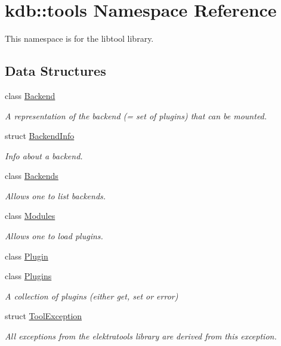 \hypertarget{namespacekdb_1_1tools}{\section{kdb\-:\-:tools Namespace Reference}
\label{namespacekdb_1_1tools}
}


This namespace is for the libtool library.  


\subsection*{Data Structures}
\begin{DoxyCompactItemize}
\item 
class \hyperlink{classkdb_1_1tools_1_1Backend}{Backend}
\begin{DoxyCompactList}\small\item\em A representation of the backend (= set of plugins) that can be mounted. \end{DoxyCompactList}\item 
struct \hyperlink{structkdb_1_1tools_1_1BackendInfo}{Backend\-Info}
\begin{DoxyCompactList}\small\item\em Info about a backend. \end{DoxyCompactList}\item 
class \hyperlink{classkdb_1_1tools_1_1Backends}{Backends}
\begin{DoxyCompactList}\small\item\em Allows one to list backends. \end{DoxyCompactList}\item 
class \hyperlink{classkdb_1_1tools_1_1Modules}{Modules}
\begin{DoxyCompactList}\small\item\em Allows one to load plugins. \end{DoxyCompactList}\item 
class \hyperlink{classkdb_1_1tools_1_1Plugin}{Plugin}
\item 
class \hyperlink{classkdb_1_1tools_1_1Plugins}{Plugins}
\begin{DoxyCompactList}\small\item\em A collection of plugins (either get, set or error) \end{DoxyCompactList}\item 
struct \hyperlink{structkdb_1_1tools_1_1ToolException}{Tool\-Exception}
\begin{DoxyCompactList}\small\item\em All exceptions from the elektratools library are derived from this exception. \end{DoxyCompactList}\end{DoxyCompactItemize}


